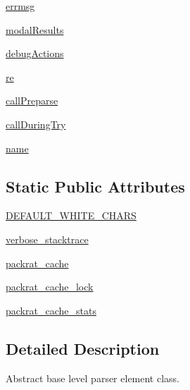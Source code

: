 \begin{DoxyCompactItemize}
\item 
\hyperlink{classpkg__resources_1_1__vendor_1_1pyparsing_1_1ParserElement_ab0fb0c673b6fef7745f9b88bb696e2e2}{errmsg}
\item 
\hyperlink{classpkg__resources_1_1__vendor_1_1pyparsing_1_1ParserElement_a58ddfa8694d03bc71f531c78011d9bc6}{modal\+Results}
\item 
\hyperlink{classpkg__resources_1_1__vendor_1_1pyparsing_1_1ParserElement_a385ac6105039c270be549aa790fdb11a}{debug\+Actions}
\item 
\hyperlink{classpkg__resources_1_1__vendor_1_1pyparsing_1_1ParserElement_a1058fb0f13bd893fcb39713569f3fbf3}{re}
\item 
\hyperlink{classpkg__resources_1_1__vendor_1_1pyparsing_1_1ParserElement_ac280acd1e4ed0dcd9d33fd61733acd1f}{call\+Preparse}
\item 
\hyperlink{classpkg__resources_1_1__vendor_1_1pyparsing_1_1ParserElement_a9653a1ad3d53b70c498010bf36f4f36a}{call\+During\+Try}
\item 
\hyperlink{classpkg__resources_1_1__vendor_1_1pyparsing_1_1ParserElement_a5c6a6316d9f079f59fd7e589559de911}{name}
\end{DoxyCompactItemize}
\subsection*{Static Public Attributes}
\begin{DoxyCompactItemize}
\item 
\hyperlink{classpkg__resources_1_1__vendor_1_1pyparsing_1_1ParserElement_a1239e2ae652ba10497032c8ceb799f7b}{D\+E\+F\+A\+U\+L\+T\+\_\+\+W\+H\+I\+T\+E\+\_\+\+C\+H\+A\+RS}
\item 
\hyperlink{classpkg__resources_1_1__vendor_1_1pyparsing_1_1ParserElement_a8bf465f46db9a2ec6f1a76971fa3088d}{verbose\+\_\+stacktrace}
\item 
\hyperlink{classpkg__resources_1_1__vendor_1_1pyparsing_1_1ParserElement_a5e8aec6c29c7e419ebc72a6e4d08ea2a}{packrat\+\_\+cache}
\item 
\hyperlink{classpkg__resources_1_1__vendor_1_1pyparsing_1_1ParserElement_aaa7bc85eb703498dff5b2d08092ef021}{packrat\+\_\+cache\+\_\+lock}
\item 
\hyperlink{classpkg__resources_1_1__vendor_1_1pyparsing_1_1ParserElement_a32075eb6d84b9fa3e33462a0e8358c11}{packrat\+\_\+cache\+\_\+stats}
\end{DoxyCompactItemize}


\subsection{Detailed Description}
\begin{DoxyVerb}Abstract base level parser element class.\end{DoxyVerb}
 

